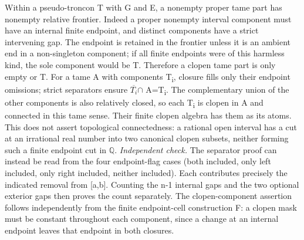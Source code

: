 Within a pseudo-troncon T with G and E, a nonempty proper tame part has nonempty relative frontier. Indeed a proper nonempty interval component must have an internal finite endpoint, and distinct components have a strict intervening gap. The endpoint is retained in the frontier unless it is an ambient end in a non-singleton component; if all finite endpoints were of this harmless kind, the sole component would be T. Therefore a clopen tame part is only empty or T. For a tame A with components T\textsubscript{i}, closure fills only their endpoint omissions; strict separators ensure $\overline{T_i}$$\cap$ A=T\textsubscript{i}. The complementary union of the other components is also relatively closed, so each T\textsubscript{i} is clopen in A and connected in this tame sense. Their finite clopen algebra has them as its atoms. This does not assert topological connectedness: a rational open interval has a cut at an irrational real number into two canonical clopen subsets, neither forming such a finite endpoint cut in $\mathbb Q$.
\emph{Independent check.} The separator proof can instead be read from the four endpoint-flag cases (both included, only left included, only right included, neither included). Each contributes precisely the indicated removal from [a,b]. Counting the n-1 internal gaps and the two optional exterior gaps then proves the count separately. The clopen-component assertion follows independently from the finite endpoint-cell construction F: a clopen mask must be constant throughout each component, since a change at an internal endpoint leaves that endpoint in both closures.

